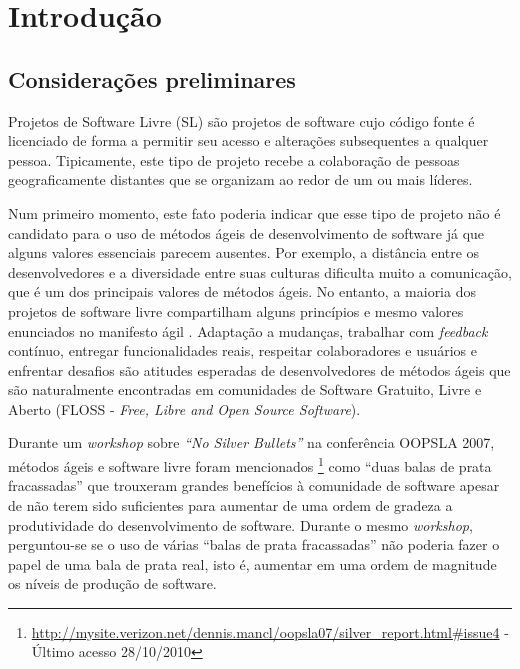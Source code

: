\chapter{Introdução}
\label{cap:introducao}

\section{Considerações preliminares}
\label{sec:consideracoes_preliminares}

Projetos de Software Livre (SL) são projetos de software cujo código
fonte é licenciado de forma a permitir seu acesso e alterações
subsequentes a qualquer pessoa. Tipicamente, este tipo de projeto
recebe a colaboração de pessoas geograficamente distantes
\cite{Dempsey1999} que se organizam ao redor de um ou mais líderes.

Num primeiro momento, este fato poderia indicar que esse tipo de
projeto não é candidato para o uso de métodos ágeis de desenvolvimento
de software já que alguns valores essenciais parecem ausentes. Por
exemplo, a distância entre os desenvolvedores e a diversidade entre
suas culturas dificulta muito a comunicação, que é um dos principais
valores de métodos ágeis. No entanto, a maioria dos projetos de
software livre compartilham alguns princípios e mesmo valores
enunciados no manifesto ágil \cite{AgileManifesto}. Adaptação a
mudanças, trabalhar com \emph{feedback} contínuo, entregar
funcionalidades reais, respeitar colaboradores e usuários e enfrentar
desafios são atitudes esperadas de desenvolvedores de métodos ágeis
que são naturalmente encontradas em comunidades de Software Gratuito,
Livre e Aberto (FLOSS - \emph{Free, Libre and Open Source Software}).

Durante um \emph{workshop} \cite{OOPSLA07} sobre \emph{``No Silver
  Bullets''} \cite{Brooks1987} na conferência OOPSLA 2007, métodos
ágeis e software livre foram mencionados
\footnote{\url{http://mysite.verizon.net/dennis.mancl/oopsla07/silver_report.html\#issue4}
  - Último acesso 28/10/2010} como ``duas balas de prata fracassadas''
que trouxeram grandes benefícios à comunidade de software apesar de
não terem sido suficientes para aumentar de uma ordem de gradeza a
produtividade do desenvolvimento de software. Durante o mesmo
\emph{workshop}, perguntou-se se o uso de várias ``balas de prata
fracassadas'' não poderia fazer o papel de uma bala de prata real,
isto é, aumentar em uma ordem de magnitude os níveis de produção de
software.

